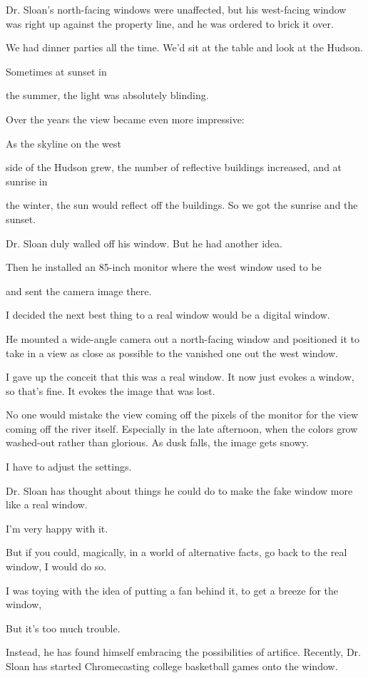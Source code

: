 Dr. Sloan's north-facing windows were unaffected, but his west-facing
window was right up against the property line, and he was ordered to
brick it over.

We had dinner parties all the time. We'd sit at the table and look at
the Hudson.

Sometimes at sunset in

the summer, the light was absolutely blinding.

Over the years the view became even more impressive:

As the skyline on the west

side of the Hudson grew, the number of reflective buildings increased,
and at sunrise in

the winter, the sun would reflect off the buildings. So we got the
sunrise and the sunset.

Dr. Sloan duly walled off his window. But he had another idea.

Then he installed an 85-inch monitor where the west window used to be

and sent the camera image there.

I decided the next best thing to a real window would be a digital
window.

He mounted a wide-angle camera out a north-facing window and positioned
it to take in a view as close as possible to the vanished one out the
west window.

I gave up the conceit that this was a real window. It now just evokes a
window, so that's fine. It evokes the image that was lost.

No one would mistake the view coming off the pixels of the monitor for
the view coming off the river itself. Especially in the late afternoon,
when the colors grow washed-out rather than glorious. As dusk falls, the
image gets snowy.

I have to adjust the settings.

Dr. Sloan has thought about things he could do to make the fake window
more like a real window.

I'm very happy with it.

But if you could, magically, in a world of alternative facts, go back to
the real window, I would do so.

I was toying with the idea of putting a fan behind it, to get a breeze
for the window,

But it's too much trouble.

Instead, he has found himself embracing the possibilities of artifice.
Recently, Dr. Sloan has started Chromecasting college basketball games
onto the window.

